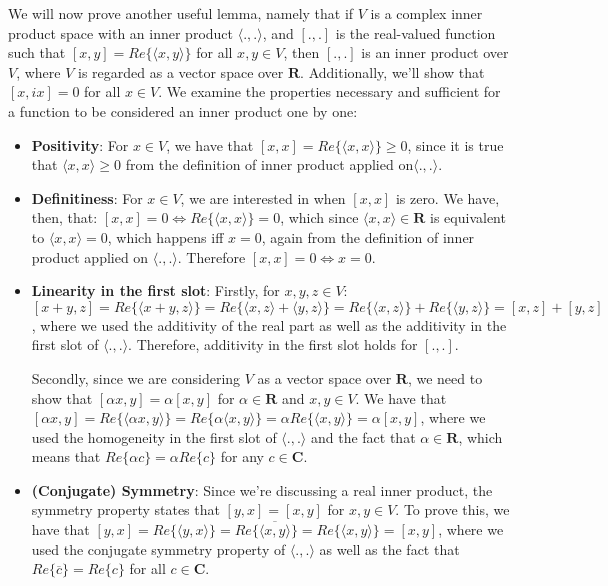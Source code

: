 \begin{solution}
We will now prove another useful lemma, namely that if $V$ is a complex inner product space with an inner product $\langle ., . \rangle$, and $[., .]$ is the real-valued function such that $[x, y] = Re\{\langle x, y \rangle\}$ for all $x, y \in V$, then $[., .]$ is an inner product over $V$, where $V$ is regarded as a vector space over $\mathbf{R}$. Additionally, we'll show that $[x, ix] = 0$ for all $x \in V$. We examine the properties necessary and sufficient for a function to be considered an inner product one by one:
\begin{itemize}
    \item \textbf{Positivity}: For $x \in V$, we have that $[x, x] = Re\{\langle x, x \rangle \} \geq 0$, since it is true that $\langle x, x \rangle \geq 0$ from the definition of inner product applied on$\langle ., .\rangle$.
    \item \textbf{Definitiness}: For $x \in V$, we are interested in when $[x, x]$ is zero. We have, then, that: $[x, x] = 0 \iff Re\{ \langle x, x \rangle \} = 0$, which since $\langle x, x \rangle \in \mathbf{R}$ is equivalent to $\langle x, x \rangle = 0$, which happens iff $x = 0$, again from the definition of inner product applied on $\langle ., . \rangle$. Therefore $[x, x] = 0 \iff x = 0$.
    \item \textbf{Linearity in the first slot}: Firstly, for $x, y ,z \in V$: $[x + y, z] = Re\{\langle x + y, z \rangle\} = Re\{ \langle x, z \rangle + \langle y, z \rangle\} = Re\{\langle x, z \rangle\} + Re\{ \langle y, z \rangle\} = [x, z] + [y, z]$, where we used the additivity of the real part as well as the additivity in the first slot of $\langle ., . \rangle$. Therefore, additivity in the first slot holds for $[., . ]$.

    Secondly, since we are considering $V$ as a vector space over $\mathbf{R}$, we need to show that $[\alpha x, y] = \alpha[x, y]$ for $\alpha \in \mathbf{R}$ and $x, y \in V$. We have that $[\alpha x, y ] = Re\{\langle \alpha x, y \rangle\} = Re\{ \alpha \langle x, y \rangle\} = \alpha Re\{ \langle x, y \rangle\} = \alpha[x, y]$, where we used the homogeneity in the first slot of $\langle ., . \rangle$ and the fact that $\alpha \in \mathbf{R}$, which means that $Re\{\alpha c \} = \alpha Re\{c\}$ for any $c \in \mathbf{C}$.
    \item \textbf{(Conjugate) Symmetry}: Since we're discussing a real inner product, the symmetry property states that $[y, x] = [x, y]$ for $x, y \in V$. To prove this, we have that $[y, x] = Re\{\langle y, x \rangle\} = Re\{\overline{ \langle x, y \rangle}\} = Re\{\langle x, y \rangle\} = [x, y]$, where we used the conjugate symmetry property of $\langle ., . \rangle$ as well as the fact that $Re\{\overline{c}\} = Re\{c\}$ for all $c \in \mathbf{C}$.


\end{itemize}
\end{solution}
